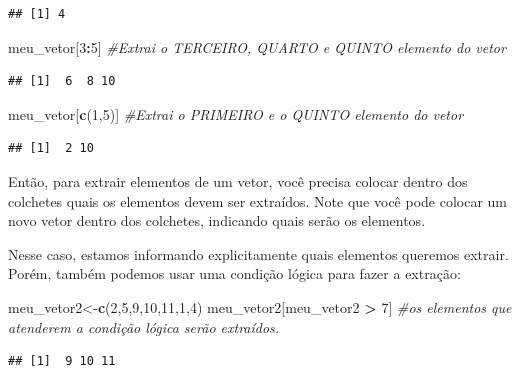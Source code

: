 \documentclass[
]{book}
\newenvironment{Shaded}{\begin{snugshade}}{\end{snugshade}}
\newcommand{\CommentTok}[1]{\textcolor[rgb]{0.56,0.35,0.01}{\textit{#1}}}
\newcommand{\DecValTok}[1]{\textcolor[rgb]{0.00,0.00,0.81}{#1}}
\newcommand{\KeywordTok}[1]{\textcolor[rgb]{0.13,0.29,0.53}{\textbf{#1}}}
\newcommand{\NormalTok}[1]{#1}
\newcommand{\OperatorTok}[1]{\textcolor[rgb]{0.81,0.36,0.00}{\textbf{#1}}}
\newcommand{\StringTok}[1]{\textcolor[rgb]{0.31,0.60,0.02}{#1}}
\begin{document}
\begin{verbatim}
## [1] 4
\end{verbatim}

\begin{Shaded}
\begin{Highlighting}[]
\NormalTok{meu_vetor[}\DecValTok{3}\OperatorTok{:}\DecValTok{5}\NormalTok{] }\CommentTok{#Extrai o TERCEIRO, QUARTO e QUINTO elemento do vetor}
\end{Highlighting}
\end{Shaded}

\begin{verbatim}
## [1]  6  8 10
\end{verbatim}

\begin{Shaded}
\begin{Highlighting}[]
\NormalTok{meu_vetor[}\KeywordTok{c}\NormalTok{(}\DecValTok{1}\NormalTok{,}\DecValTok{5}\NormalTok{)] }\CommentTok{#Extrai o PRIMEIRO e o QUINTO elemento do vetor}
\end{Highlighting}
\end{Shaded}

\begin{verbatim}
## [1]  2 10
\end{verbatim}

Então, para extrair elementos de um vetor, você precisa colocar dentro
dos colchetes quais os elementos devem ser extraídos. Note que você pode
colocar um novo vetor dentro dos colchetes, indicando quais serão os
elementos.

Nesse caso, estamos informando explicitamente quais elementos queremos
extrair. Porém, também podemos usar uma condição lógica para fazer a
extração:

\begin{Shaded}
\begin{Highlighting}[]
\NormalTok{meu_vetor2<-}\KeywordTok{c}\NormalTok{(}\DecValTok{2}\NormalTok{,}\DecValTok{5}\NormalTok{,}\DecValTok{9}\NormalTok{,}\DecValTok{10}\NormalTok{,}\DecValTok{11}\NormalTok{,}\DecValTok{1}\NormalTok{,}\DecValTok{4}\NormalTok{)}
\NormalTok{meu_vetor2[meu_vetor2 }\OperatorTok{>}\StringTok{ }\DecValTok{7}\NormalTok{]  }\CommentTok{#os elementos que atenderem a condição lógica serão extraídos.}
\end{Highlighting}
\end{Shaded}

\begin{verbatim}
## [1]  9 10 11
\end{verbatim}
\end{document}

